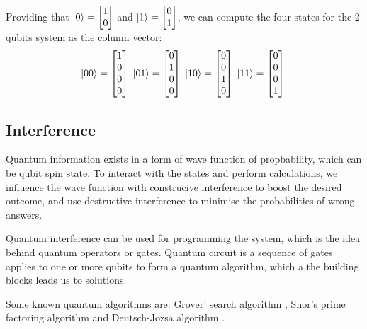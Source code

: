Providing that $\left\vert{0}\right\rangle = \begin{bmatrix}1 \\ 0\end{bmatrix}$ and $\left\vert{1}\right\rangle = \begin{bmatrix}0 \\ 1\end{bmatrix}$, we can compute the four states for the 2 qubits system as the column vector:
\begin{equation}
    \left\vert{00}\right\rangle = \begin{bmatrix}1 \\ 0 \\ 0 \\ 0 \end{bmatrix} \;
    \left\vert{01}\right\rangle = \begin{bmatrix}0 \\ 1 \\ 0 \\ 0 \end{bmatrix} \;
    \left\vert{10}\right\rangle = \begin{bmatrix}0 \\ 0 \\ 1 \\ 0 \end{bmatrix} \;
    \left\vert{11}\right\rangle = \begin{bmatrix}0 \\ 0 \\ 0 \\ 1 \end{bmatrix} \;
\end{equation}

\subsection{Interference} \label{Sec: Interference}

Quantum information exists in a form of wave function of propbability, which can be qubit spin state.
To interact with the states and perform calculations, we influence the wave function with construcive interference to boost the desired outcome, and use destructive interference to minimise the probabilities of wrong answers.

Quantum interference can be used for programming the system, which is the idea behind quantum operators or gates.
Quantum circuit is a sequence of gates applies to one or more qubits to form a quantum algorithm, which a the building blocks leads us to solutions.

Some known quantum algorithms are: Grover' search algorithm \cite{groverFastQuantumMechanical1996}, Shor's prime factoring algorithm \cite{shorAlgorithmsQuantumComputation1994} and Deutsch-Jozsa algorithm \cite{deutschRapidSolutionProblems1992}.